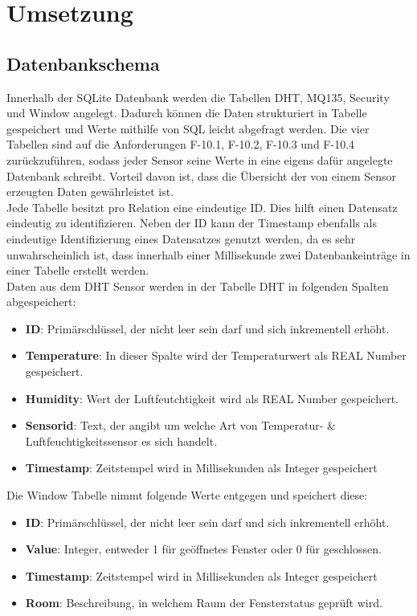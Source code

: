 \chapter{Umsetzung} \label{sec:Umsetzung}

\section{Datenbankschema}\label{db:DB}
Innerhalb der SQLite Datenbank werden die Tabellen DHT, MQ135, Security und Window angelegt. Dadurch können die Daten strukturiert in Tabelle gespeichert und Werte mithilfe von SQL leicht abgefragt werden. Die vier Tabellen sind auf die Anforderungen F-10.1, F-10.2, F-10.3 und F-10.4 zurückzuführen, sodass jeder Sensor seine Werte in eine eigens dafür angelegte Datenbank schreibt. Vorteil davon ist, dass die Übersicht der von einem Sensor erzeugten Daten gewährleistet ist.\\
Jede Tabelle besitzt pro Relation eine eindeutige ID. Dies hilft einen Datensatz eindeutig zu identifizieren. Neben der ID kann der Timestamp ebenfalls als eindeutige Identifizierung eines Datensatzes genutzt werden, da es sehr unwahrscheinlich ist, dass innerhalb einer Millisekunde zwei Datenbankeinträge in einer Tabelle erstellt werden.\\

Daten aus dem DHT Sensor werden in der Tabelle DHT in folgenden Spalten abgespeichert:
\begin{itemize}
	\item \textbf{ID}: Primärschlüssel, der nicht leer sein darf und sich inkrementell erhöht.  
	\item \textbf{Temperature}: In dieser Spalte wird der Temperaturwert als REAL Number gespeichert.
	\item \textbf{Humidity}: Wert der Luftfeutchtigkeit wird als REAL Number gespeichert.
	\item \textbf{Sensorid}: Text, der angibt um welche Art von Temperatur- \& Luftfeuchtigkeitssensor es sich handelt.
	\item \textbf{Timestamp}: Zeitstempel wird in Millisekunden als Integer gespeichert
\end{itemize}

Die Window Tabelle nimmt folgende Werte entgegen und speichert diese:
\begin{itemize}
	\item \textbf{ID}: Primärschlüssel, der nicht leer sein darf und sich inkrementell erhöht.  
	\item \textbf{Value}: Integer, entweder 1 für geöffnetes Fenster oder 0 für geschlossen.
	\item \textbf{Timestamp}: Zeitstempel wird in Millisekunden als Integer gespeichert
	\item \textbf{Room}: Beschreibung, in welchem Raum der Fensterstatus geprüft wird. 
\end{itemize}

